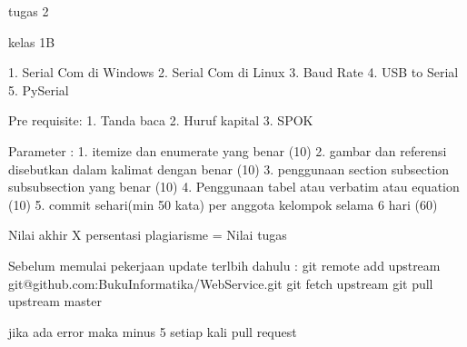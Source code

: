 tugas 2

kelas 1B

1. Serial Com di Windows
2. Serial Com di Linux
3. Baud Rate
4. USB to Serial
5. PySerial

Pre requisite:
1. Tanda baca
2. Huruf kapital
3. SPOK

Parameter :
1. itemize dan enumerate yang benar (10)
2. gambar dan referensi disebutkan dalam kalimat dengan benar (10)
3. penggunaan section subsection subsubsection yang benar (10)
4. Penggunaan tabel atau verbatim atau equation (10)
5. commit sehari(min 50 kata) per anggota kelompok selama 6 hari (60)

Nilai akhir X persentasi plagiarisme = Nilai tugas

Sebelum memulai pekerjaan update terlbih dahulu :
git remote add upstream git@github.com:BukuInformatika/WebService.git
git fetch upstream
git pull upstream master

jika ada error maka minus 5 setiap kali pull request